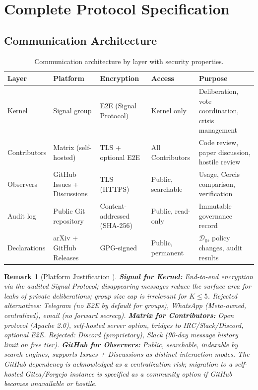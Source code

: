 \documentclass[12pt,a4paper]{article}
\newtheorem{remark}[theorem]{Remark}
\theoremstyle{definition}
\newcommand{\GzeroDecl}{\mathcal{D}_{0}}
\begin{document}
\section{Complete Protocol Specification}
\label{sec:spec}
\subsection{Communication Architecture}
\begin{table}[htbp]
\centering
\caption{Communication architecture by layer with security properties.}
\label{tab:communication}
\begin{tabular}{p{2cm}p{2.8cm}p{2.5cm}p{3cm}p{3.2cm}}
\toprule
\textbf{Layer} & \textbf{Platform} & \textbf{Encryption} & \textbf{Access} & \textbf{Purpose} \\
\midrule
Kernel & Signal group & E2E (Signal Protocol) & Kernel only & Deliberation, vote coordination, crisis management \\
Contributors & Matrix (self-hosted) & TLS + optional E2E & All Contributors & Code review, paper discussion, hostile review \\
Observers & GitHub Issues + Discussions & TLS (HTTPS) & Public, searchable & Usage, Cercis comparison, verification \\
Audit log & Public Git repository & Content-addressed (SHA-256) & Public, read-only & Immutable governance record \\
Declarations & arXiv + GitHub Releases & GPG-signed & Public, permanent & $\GzeroDecl$, policy changes, audit results \\
\bottomrule
\end{tabular}
\end{table}
\begin{remark}[Platform Justification ]
\label{rem:platforms}
\textbf{Signal for Kernel:} End-to-end encryption via the audited Signal Protocol; disappearing messages reduce the surface area for leaks of private deliberations; group size cap is irrelevant for $K \leq 5$. Rejected alternatives: Telegram (no E2E by default for groups), WhatsApp (Meta-owned, centralized), email (no forward secrecy). \textbf{Matrix for Contributors:} Open protocol (Apache 2.0), self-hosted server option, bridges to IRC/Slack/Discord, optional E2E. Rejected: Discord (proprietary), Slack (90-day message history limit on free tier). \textbf{GitHub for Observers:} Public, searchable, indexable by search engines, supports Issues + Discussions as distinct interaction modes. The GitHub dependency is acknowledged as a centralization risk; migration to a self-hosted Gitea/Forgejo instance is specified as a community option if GitHub becomes unavailable or hostile.
\end{remark}
\end{document}
